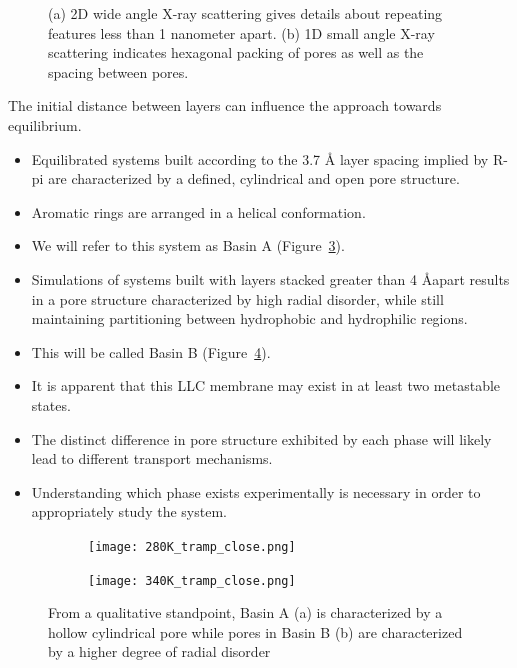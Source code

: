 \documentclass{article}
\newcommand{\angstrom}{\textup{\AA}}
\begin{document}
\begin{figure}[!ht]
\begin{subfigure}[t]{0.43\linewidth}
		\caption{}\label{fig:SAXS}
	\end{subfigure}
	\caption{(a) 2D wide angle X-ray scattering gives details about repeating
	features less than 1 nanometer apart. (b) 1D small angle X-ray scattering 
	indicates hexagonal packing of pores as well as the spacing between pores.}\label{fig:SWAXS}
  \end{figure}
  
  The initial distance between layers can influence the approach towards
  equilibrium. 
  \begin{itemize}
  	\item Equilibrated systems built according to the 3.7 \angstrom 
	layer spacing implied by R-pi are characterized by a defined, cylindrical and
	open pore structure.
	\item Aromatic rings are arranged in a helical conformation.%
	\item We will refer to this system as Basin A (Figure~\ref{fig:abasin}).
	\item Simulations of systems built with layers stacked greater than 4 
	\angstrom apart results in a pore structure characterized by high radial 
	disorder, while still maintaining partitioning between hydrophobic and 
	hydrophilic regions.
	\item This will be called Basin B (Figure~\ref{fig:bbasin}).
	\item It is apparent that this LLC membrane may exist in at least two metastable states.
	\item The distinct difference in pore structure exhibited by each phase will 
	likely lead to different transport mechanisms.
	\item Understanding which phase exists experimentally is necessary in order
	to appropriately study the system.
  \end{itemize}
  
  \begin{figure}[!ht]
        \centering
        \begin{subfigure}[b]{0.475\textwidth}
                \centering
                \texttt{[image: 280K\_tramp\_close.png]}
                \caption{}\label{fig:abasin}
        \end{subfigure}
        \begin{subfigure}[b]{0.475\textwidth}
                \centering
                \texttt{[image: 340K\_tramp\_close.png]}
                \caption{}\label{fig:bbasin}
        \end{subfigure}
	\caption{From a qualitative standpoint, Basin A (a) is characterized by a
	hollow cylindrical pore while pores in Basin B (b) are characterized by a
	higher degree of radial disorder}\label{fig:basins}
  \end{figure}
\end{document}
